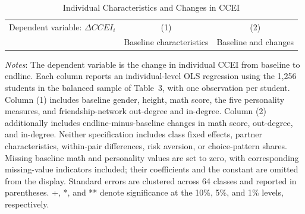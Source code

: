 \documentclass[11pt]{article}
\begin{document}
\begin{table}[H]
\centering
\singlespacing
\caption{Individual Characteristics and Changes in CCEI}
\label{tab:individual_ccei_change}
\small
\renewcommand{\arraystretch}{1.05}
\begin{tabular*}{0.9\textwidth}{@{\extracolsep{\fill}}lcc}
\toprule
Dependent variable: $\Delta CCEI_i$ & (1) & (2) \\
 & Baseline characteristics & Baseline and changes \\
\midrule

\end{tabular*}
\par\smallskip
\begin{minipage}{\textwidth}
\footnotesize
\emph{Notes}: The dependent variable is the change in individual CCEI from baseline to endline. Each column reports an individual-level OLS regression using the 1,256 students in the balanced sample of Table~3, with one observation per student. Column (1) includes baseline gender, height, math score, the five personality measures, and friendship-network out-degree and in-degree. Column (2) additionally includes endline-minus-baseline changes in math score, out-degree, and in-degree. Neither specification includes class fixed effects, partner characteristics, within-pair differences, risk aversion, or choice-pattern shares. Missing baseline math and personality values are set to zero, with corresponding missing-value indicators included; their coefficients and the constant are omitted from the display. Standard errors are clustered across 64 classes and reported in parentheses. +, *, and ** denote significance at the 10\%, 5\%, and 1\% levels, respectively.
\end{minipage}
\end{table}
\end{document}
